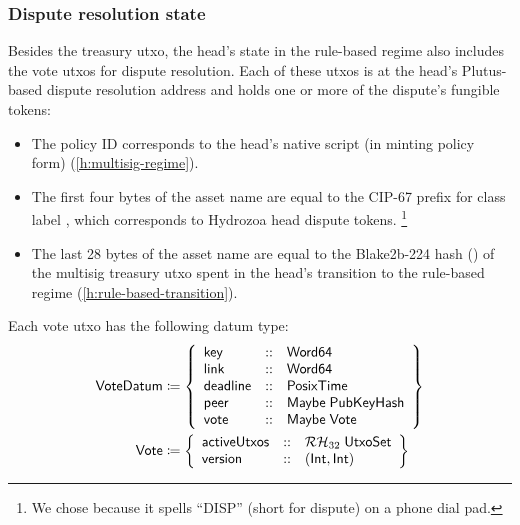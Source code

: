 \documentclass[../hydrozoa.tex]{subfiles}
\begin{document}
\subsubsection{Dispute resolution state}%
\label{h:rule-based-dispute-resolution-state}
Besides the treasury utxo, the head's state in the rule-based regime also includes the vote utxos for dispute resolution.
Each of these utxos is at the head's Plutus-based dispute resolution address and holds one or more of the dispute's fungible tokens:
\begin{itemize}
  \item The policy ID corresponds to the head's native script (in minting policy form) (\cref{h:multisig-regime}).
  \item The first four bytes of the asset name are equal to the CIP-67
    \citep{AlessandroKonradThomasVellekoopCIP67AssetName2022}
    prefix for class label \inlineColored{\disputeTokenNum}, which corresponds to Hydrozoa head dispute tokens.%
    \footnote{We chose \inlineColored{\disputeTokenNum} because it spells ``DISP'' (short for dispute) on a phone dial pad.}
  \item The last 28 bytes of the asset name are equal to the Blake2b-224 hash () of the multisig treasury utxo spent in the head's transition to the rule-based regime (\cref{h:rule-based-transition}).
\end{itemize}

Each vote utxo has the following datum type:
\begin{equation*}
\begin{split}
  \mathsf{VoteDatum} &\coloneq \left\{
    \begin{array}{lll}
      \mathsf{key}  &::& \mathsf{Word64} \\
      \mathsf{link} &::& \mathsf{Word64} \\
      \mathsf{deadline} &::& \mathsf{PosixTime} \\
      \mathsf{peer} &::& \mathsf{Maybe} \; \mathsf{PubKeyHash} \\
      \mathsf{vote} &::& \mathsf{Maybe} \; \mathsf{Vote}
    \end{array}\right\}\\
  \mathsf{Vote} &\coloneq \left\{
    \begin{array}{lll}
      \mathsf{activeUtxos} &::& \mathcal{RH}_{32} \; \mathsf{UtxoSet} \\
      \mathsf{version} &::& (\mathsf{Int}, \mathsf{Int})
    \end{array}\right\}
\end{split}
\end{equation*}
\end{document}
